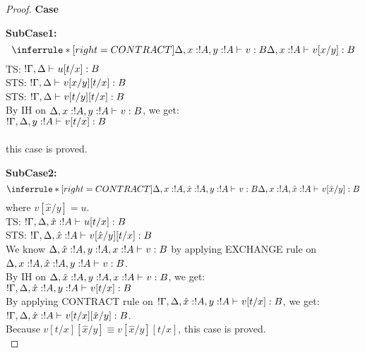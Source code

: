\documentclass[titlepage]{article}
\begin{document}
\begin{proof}
  \noindent \textbf{Case}

  \noindent \textbf{SubCase1:}
  \[
   \inferrule*[ right = CONTRACT ]
   {\Delta, x:!A, y:!A \jtype{}{}{v}{B}}
   { \Delta, x:!A \jtype{}{}{v[x/y]}{B}}
  \]  
  TS: $! \Gamma, \Delta \mathrel{\vdash_{}^{} {u[t/x]} : {B}}$ \\
  STS: $! \Gamma, \Delta \mathrel{\vdash_{}^{} {v[x/y][t/x]} : {B}}$ \\
  STS: $! \Gamma, \Delta \mathrel{\vdash_{}^{} {v[t/y][t/x]} : {B}}$ \\
  By IH on $\Delta, x:!A, y:!A \mathrel{\vdash_{}^{} {v} : {B}}$, we get:\\
  $! \Gamma, \Delta, y:!A \mathrel{\vdash_{}^{} {v[t/x]} : {B}} $\\
  \\
  this case is proved.



  \noindent \textbf{SubCase2:}
  \[
   \inferrule*[ right = CONTRACT ]
   {\Delta, x:!A, \hat{x}:!A, y:!A \jtype{}{}{v}{B}}
   { \Delta, x:!A, \hat{x}:!A  \jtype{}{}{v[\hat{x}/y]}{B}}
  \]  
  where $v[\hat{x}/y] = u$.\\
  TS: $! \Gamma, \Delta, \hat{x}:!A \mathrel{\vdash_{}^{} {u[t/x]} : {B}}$ \\
  STS: $! \Gamma, \Delta, \hat{x}:!A \mathrel{\vdash_{}^{} {v[\hat{x}/y][t/x]} : {B}}$ \\
  We know $\Delta, \hat{x}:!A, y:!A, x:!A \mathrel{\vdash_{}^{} {v} : {B}}$ by applying EXCHANGE rule on $\Delta, x:!A, \hat{x}:!A, y:!A \mathrel{\vdash_{}^{} {v} : {B}}$.\\
  By IH on $\Delta, \hat{x}:!A, y:!A, x:!A \mathrel{\vdash_{}^{} {v} : {B}}$, we get:\\
  $!\Gamma, \Delta, \hat{x}:!A, y:!A \mathrel{\vdash_{}^{} {v[t/x]} : {B}} $\\
  By applying CONTRACT rule on $!\Gamma, \Delta, \hat{x}:!A, y:!A \mathrel{\vdash_{}^{} {v[t/x]} : {B}} $, we get:\\
  $! \Gamma, \Delta, \hat{x}:!A \mathrel{\vdash_{}^{} {v[t/x][\hat{x}/y]} : {B}}$.\\
  Because $v[t/x][\hat{x}/y] \equiv v[\hat{x}/y][t/x]$, this case is proved.\\



\end{proof}
\end{document}
